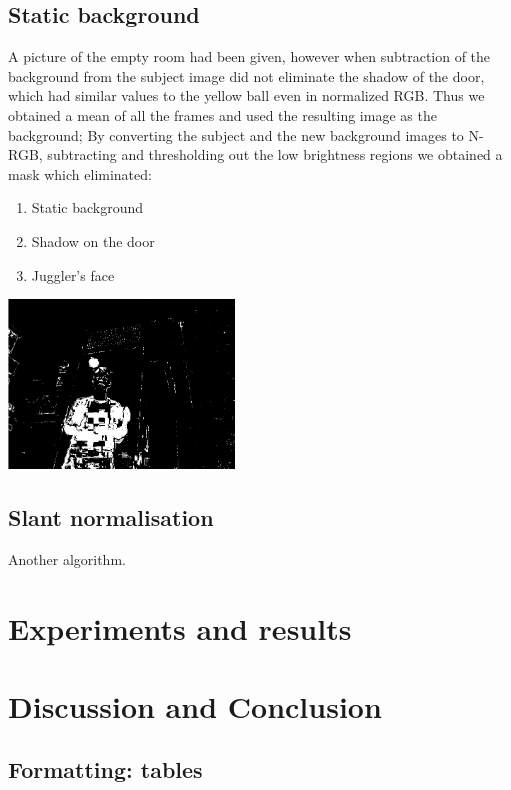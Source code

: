 \documentclass[10pt,a4paper,oneclumn]{article}
\begin{document}
\subsection{Static background}

A picture of the empty room had been given, however when subtraction of the background from the subject image did not eliminate the shadow of the door, which had similar values to the yellow ball even in normalized RGB. Thus we obtained a mean of all the frames and used the resulting image as the background; By converting the subject and the new background images to N-RGB, subtracting and thresholding out the low brightness regions we obtained a mask which eliminated:
\begin{enumerate}
\item Static background
\item Shadow on the door
\item Juggler's face
\end{enumerate}

\begin{center}
  \includegraphics[width=6cm]{figures/avnrgbdifhsvmask.png}
\end{center}

\subsection{Slant normalisation}

Another algorithm.

\section{Experiments and results}

\section{Discussion and Conclusion}

\subsection{Formatting: tables}
\end{document}
